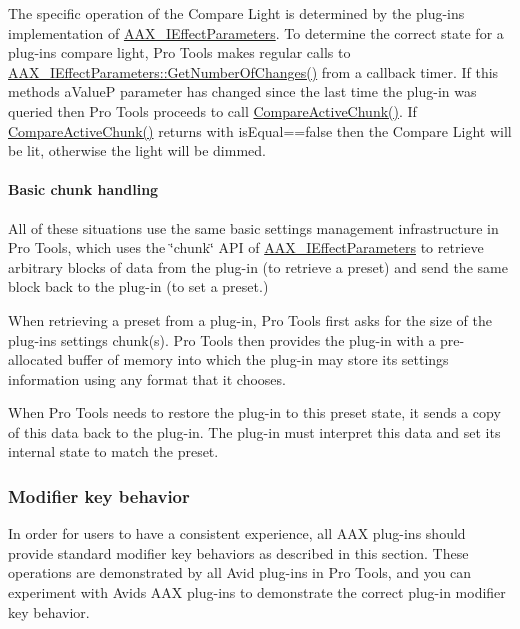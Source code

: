 The specific operation of the Compare Light is determined by the plug-\/in\textquotesingle{}s implementation of \hyperlink{a00099}{A\+A\+X\+\_\+\+I\+Effect\+Parameters}. To determine the correct state for a plug-\/in\textquotesingle{}s compare light, Pro Tools makes regular calls to \hyperlink{a00061_a17b96da201d9a242d3662e87525a7227}{A\+A\+X\+\_\+\+I\+Effect\+Parameters\+::\+Get\+Number\+Of\+Changes()} from a callback timer. If this method\textquotesingle{}s {\ttfamily a\+Value\+P} parameter has changed since the last time the plug-\/in was queried then Pro Tools proceeds to call \hyperlink{a00061_a1e86f849e970c9998313fc7d451ccf85}{Compare\+Active\+Chunk()}. If \hyperlink{a00061_a1e86f849e970c9998313fc7d451ccf85}{Compare\+Active\+Chunk()} returns with {\ttfamily is\+Equal==false} then the Compare Light will be lit, otherwise the light will be dimmed.

\hypertarget{a00360_subsubsection__basic_chunk_handling_}{}\paragraph{Basic chunk handling}\label{a00360_subsubsection__basic_chunk_handling_}
 All of these situations use the same basic settings management infrastructure in Pro Tools, which uses the \char`\"{}chunk\char`\"{} A\+P\+I of \hyperlink{a00099}{A\+A\+X\+\_\+\+I\+Effect\+Parameters} to retrieve arbitrary blocks of data from the plug-\/in (to retrieve a preset) and send the same block back to the plug-\/in (to set a preset.)

When retrieving a preset from a plug-\/in, Pro Tools first asks for the size of the plug-\/in\textquotesingle{}s settings chunk(s). Pro Tools then provides the plug-\/in with a pre-\/allocated buffer of memory into which the plug-\/in may store its settings information using any format that it chooses.

When Pro Tools needs to restore the plug-\/in to this preset state, it sends a copy of this data back to the plug-\/in. The plug-\/in must interpret this data and set its internal state to match the preset.

\hypertarget{a00360_subsection__modifier_key_behavior_}{}\subsubsection{Modifier key behavior}\label{a00360_subsection__modifier_key_behavior_}
 In order for users to have a consistent experience, all A\+A\+X plug-\/ins should provide standard modifier key behaviors as described in this section. These operations are demonstrated by all Avid plug-\/ins in Pro Tools, and you can experiment with Avid\textquotesingle{}s A\+A\+X plug-\/ins to demonstrate the correct plug-\/in modifier key behavior.

